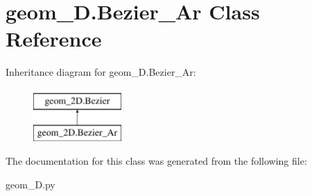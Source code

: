 \hypertarget{classgeom__2D_1_1Bezier__Ar}{\section{geom\-\_\-D.\-Bezier\-\_\-\-Ar \-Class \-Reference}
\label{classgeom__2D_1_1Bezier__Ar}
}
\-Inheritance diagram for geom\-\_\-D.\-Bezier\-\_\-\-Ar\-:\begin{figure}[H]
\begin{center}
\leavevmode
\includegraphics[height=2.000000cm]{classgeom__2D_1_1Bezier__Ar}
\end{center}
\end{figure}


\-The documentation for this class was generated from the following file\-:\begin{DoxyCompactItemize}
\item 
geom\-\_\-D.\-py\end{DoxyCompactItemize}
